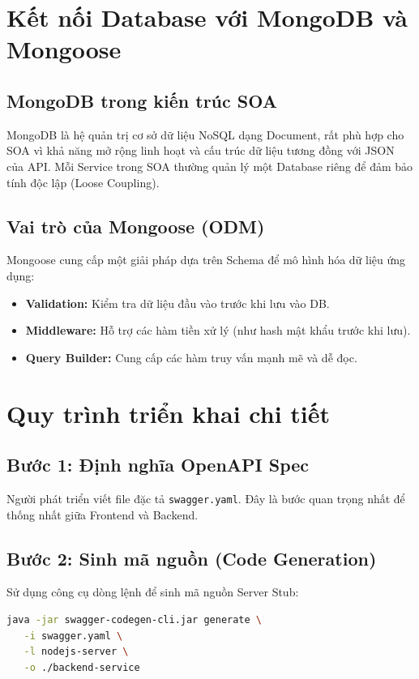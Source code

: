 \documentclass[12pt,a4paper]{article}
\begin{document}
\section{Kết nối Database với MongoDB và Mongoose}

\subsection{MongoDB trong kiến trúc SOA}
MongoDB là hệ quản trị cơ sở dữ liệu NoSQL dạng Document, rất phù hợp cho SOA vì khả năng mở rộng linh hoạt và cấu trúc dữ liệu tương đồng với JSON của API. Mỗi Service trong SOA thường quản lý một Database riêng để đảm bảo tính độc lập (Loose Coupling).

\subsection{Vai trò của Mongoose (ODM)}
Mongoose cung cấp một giải pháp dựa trên Schema để mô hình hóa dữ liệu ứng dụng:
\begin{itemize}
    \item \textbf{Validation:} Kiểm tra dữ liệu đầu vào trước khi lưu vào DB.
    \item \textbf{Middleware:} Hỗ trợ các hàm tiền xử lý (như hash mật khẩu trước khi lưu).
    \item \textbf{Query Builder:} Cung cấp các hàm truy vấn mạnh mẽ và dễ đọc.
\end{itemize}

\section{Quy trình triển khai chi tiết}

\subsection{Bước 1: Định nghĩa OpenAPI Spec}
Người phát triển viết file đặc tả \texttt{swagger.yaml}. Đây là bước quan trọng nhất để thống nhất giữa Frontend và Backend.

\subsection{Bước 2: Sinh mã nguồn (Code Generation)}
Sử dụng công cụ dòng lệnh để sinh mã nguồn Server Stub:
\begin{lstlisting}[language=bash, caption=Lệnh sinh code từ Swagger CLI]
java -jar swagger-codegen-cli.jar generate \
   -i swagger.yaml \
   -l nodejs-server \
   -o ./backend-service
\end{lstlisting}
\end{document}
